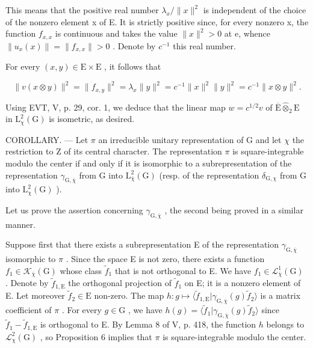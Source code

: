 This means that the positive real number \(\lambda_{x}/\|x\|^{2}\) is independent of the choice of the nonzero element x of E. It is strictly positive since, for every nonzero x, the function \(f_{x,x}\) is continuous and takes the value \(\|x\|^{2}>0\) at e, whence \(\|u_{x}(x)\|=\|f_{x,x}\|>0\) . Denote by \(c^{-1}\) this real number.

For every \((x,y)\in\mathrm{E}\times\mathrm{E}\) , it follows that

\[
\| v (x \otimes y) \| ^ {2} = \| f _ {x, y} \| ^ {2} = \lambda_ {x} \| y \| ^ {2} = c ^ {- 1} \| x \| ^ {2} \| y \| ^ {2} = c ^ {- 1} \| x \otimes y \| ^ {2}.
\]

Using EVT, V, p. 29, cor. 1, we deduce that the linear map \(w = c^{1/2}v\) of \(\overline{\mathrm{E}}\widehat{\otimes}_2\mathrm{E}\) in \(\mathrm{L}_{\chi}^{2}(\mathrm{G})\) is isometric, as desired.

 COROLLARY. --- Let \(\pi\) an irreducible unitary representation of G and let \(\chi\) the restriction to Z of its central character. The representation \(\pi\) is square-integrable modulo the center if and only if it is isomorphic to a subrepresentation of the representation \(\gamma_{\mathrm{G},\overline{\chi}}\) from G into \(\mathrm{L}_{\overline{\chi}}^{2}(\mathrm{G})\) (resp. of the representation \(\delta_{\mathrm{G},\chi}\) from G into \(\mathrm{L}_{\chi}^{2}(\mathrm{G})\) ).

Let us prove the assertion concerning \(\gamma_{\mathrm{G},\overline{\chi}}\) , the second being proved in a similar manner.

 Suppose first that there exists a subrepresentation E of the representation \(\gamma_{\mathrm{G},\overline{\chi}}\) isomorphic to \(\pi\) . Since the space E is not zero, there exists a function \(f_1 \in \mathcal{K}_{\overline{\chi}}(\mathrm{G})\) whose class \(\widetilde{f}_1\) that is not orthogonal to E. We have \(f_1 \in \mathcal{L}_{\overline{\chi}}^1 (\mathrm{G})\) . Denote by \(\widetilde{f}_{1,\mathrm{E}}\) the orthogonal projection of \(\widetilde{f}_1\) on E; it is a nonzero element of E. Let moreover \(\widetilde{f}_2 \in \mathrm{E}\) non-zero. The map \(h: g \mapsto \langle \widetilde{f}_{1,\mathrm{E}} | \gamma_{\mathrm{G},\overline{\chi}}(g)\widetilde{f}_2 \rangle\) is a matrix coefficient of \(\pi\) . For every \(g \in \mathrm{G}\) , we have \(h(g) = \langle \widetilde{f}_1 | \gamma_{\mathrm{G},\overline{\chi}}(g)\widetilde{f}_2 \rangle\) since \(\widetilde{f}_1 - \widetilde{f}_{1,\mathrm{E}}\) is orthogonal to E. By Lemma 8 of V, p. 418, the function \(h\) belongs to \(\mathcal{L}_{\chi}^{2}(\mathrm{G})\) , so Proposition 6 implies that \(\pi\) is square-integrable modulo the center.

